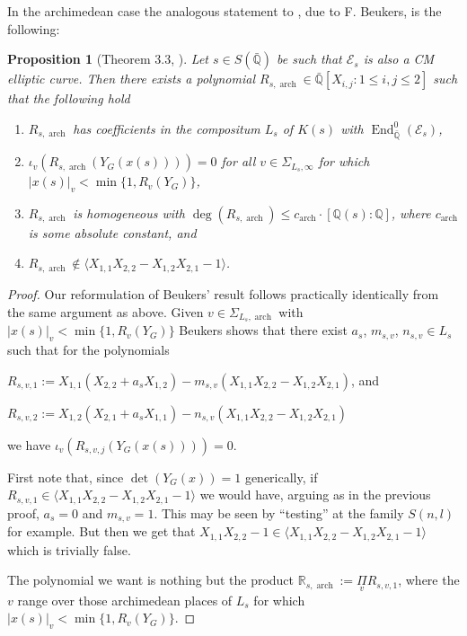 \documentclass[12pt,twoside,a4paper]{article}
\theoremstyle{plain}%
\newtheorem{prop}[theorem]{Proposition}
\DeclareMathOperator{\End}{End}
\DeclareMathOperator{\arch}{arch}
\newcommand{\Q}{\mathbb{Q}}
\newcommand{\R}{\mathbb{R}}
\newcommand{\CE}{\mathcal{E}}
\begin{document}
In the archimedean case the analogous statement to , due to F. Beukers, is the following:
\begin{prop}[Theorem $3.3$, \cite{beukers}]\label{propbeukersarch}
		Let $s\in S(\bar{\Q})$ be such that $\CE_s$ is also a CM elliptic curve. Then there exists a polynomial $R_{s,\arch}\in \bar{\Q}[X_{i,j}:1\leq i,j\leq 2]$ such that the following hold
	\begin{enumerate}
		\item $R_{s,\arch}$ has coefficients in the compositum $L_s$ of $K(s)$ with $\End_{\bar{\Q}}^{0}(\CE_s)$,
		
		\item $\iota_v(R_{s,\arch}(Y_G(x(s))))=0$ for all $v\in\Sigma_{L_s,\infty}$ for which $|x(s)|_v<\min\{1,R_v(Y_G)\}$,
		
		\item $R_{s,\arch}$ is homogeneous with $\deg(R_{s,\arch})\leq c_{\arch}\cdot [\Q(s):\Q]$, where $c_{\arch}$ is some absolute constant, and 
		
		\item $R_{s,\arch}\notin \langle X_{1,1}X_{2,2}-X_{1,2}X_{2,1}-1 \rangle $.
		\end{enumerate}\end{prop}
	
	\begin{proof}Our reformulation of Beukers' result follows practically identically from the same argument as above. Given $v\in\Sigma_{L_s,\arch}$ with $|x(s)|_v<\min\{1,R_v(Y_G)\}$ Beukers shows that there exist $a_s$, $m_{s,v}$, $n_{s,v}\in L_s$ such that for the polynomials 	\begin{center}
					$ R_{s,v,1}:=X_{1,1} (X_{2,2}+a_sX_{1,2})-m_{s,v}(X_{1,1}X_{2,2}-X_{1,2}X_{2,1})$, and 
		
				$ R_{s,v,2}:=X_{1,2} (X_{2,1}+a_sX_{1,1})-n_{s,v}(X_{1,1}X_{2,2}-X_{1,2}X_{2,1})$\end{center}
we have $\iota_v(R_{s,v,j}(Y_G(x(s))))=0$.

First note that, since $\det(Y_G(x))=1$ generically, if $R_{s,v,1}\in  \langle X_{1,1}X_{2,2}-X_{1,2}X_{2,1}-1 \rangle $ we would have, arguing as in the previous proof, $a_{s}=0$ and $m_{s,v}=1$. This may be seen by ``testing'' at the family $S(n,l)$ for example. But then we get that $X_{1,1}X_{2,2}-1\in \langle X_{1,1}X_{2,2}-X_{1,2}X_{2,1}-1 \rangle $ which is trivially false.

The polynomial we want is nothing but the product $\R_{s,\arch}:=\underset{v}{\Pi}R_{s,v,1}$, where the $v$ range over those archimedean places of $L_s$ for which $|x(s)|_v<\min\{1,R_v(Y_G)\}$.\end{proof}
\end{document}
